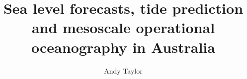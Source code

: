 \documentclass[11pt,a4paper,titlepage,twoside,openrigh]{book}
\title{Sea level forecasts, tide prediction and mesoscale operational oceanography in Australia}
\author{Andy Taylor}
\begin{document}
	\begin{frontmatter}
		\frontmatterheadings    %
		\maketitle              %
		\makedeclaration        %
		
		
		{
			\singlespacing
			\tableofcontents
			\listoffigures
		   \clearpage
		}
   \end{frontmatter}
	\begin{mainmatter}
		\mainmatterheadings
		
		
		
		
		
	\end{mainmatter}
	
	
    \begin{appendix}
		
	\end{appendix}
\end{document}
